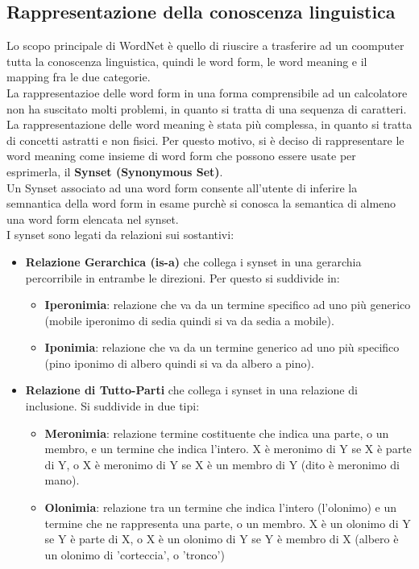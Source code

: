 \documentclass{report}
\begin{document}
	\subsection{Rappresentazione della conoscenza linguistica}
	Lo scopo principale di WordNet è quello di riuscire a trasferire ad un coomputer tutta la conoscenza linguistica, quindi le word form, le word meaning e il mapping fra le due categorie.
	\vspace{\baselineskip}\\
	La rappresentazioe delle word form in una forma comprensibile ad un calcolatore non ha suscitato molti problemi, in quanto si tratta di una sequenza di caratteri. La rappresentazione delle word meaning è stata più complessa, in quanto si tratta di concetti astratti e non fisici. Per questo motivo, si è deciso di rappresentare le word meaning come insieme di word form che possono essere usate per esprimerla, il \textbf{Synset (Synonymous Set)}. 
	\vspace{\baselineskip}\\
	Un Synset associato ad una word form consente all'utente di inferire la semnantica della word form in esame purchè si conosca la semantica di almeno una word form elencata nel synset. \\
	I synset sono legati da relazioni sui sostantivi:
	\begin{itemize}
		\item \textbf{Relazione Gerarchica (is-a)} che collega i synset in una gerarchia percorribile in entrambe le direzioni. Per questo si suddivide in:
		\begin{itemize}
			\item \textbf{Iperonimia}: relazione che va da un termine specifico ad uno più generico (mobile iperonimo di sedia quindi si va da sedia a mobile).
			\item \textbf{Iponimia}: relazione che va da un termine generico ad uno più specifico (pino iponimo di albero quindi si va da albero a pino).
		\end{itemize}
		\item \textbf{Relazione di Tutto-Parti} che collega i synset in una relazione di inclusione. Si suddivide in due tipi:
		\begin{itemize}
			\item \textbf{Meronimia}: relazione termine costituente che indica una parte, o un membro, e un termine che indica l'intero. X è meronimo di Y se X è parte di Y, o X è meronimo di Y se X è un membro di Y (dito è meronimo di mano).
			\item \textbf{Olonimia}: relazione tra un termine che indica l'intero (l'olonimo) e un termine che ne rappresenta una parte, o un membro. X è un olonimo di Y se Y è parte di X, o X è un olonimo di Y se Y è membro di X (albero è un olonimo di 'corteccia', o 'tronco')
		\end{itemize}
	\end{itemize}
\end{document}
